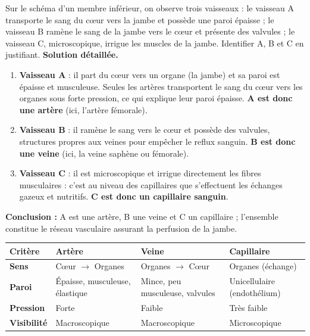 \documentclass[11pt]{article}
\begin{document}
\begin{exoresolu}
Sur le schéma d'un membre inférieur, on observe trois vaisseaux : le vaisseau A transporte le sang du cœur vers la jambe et possède une paroi épaisse ; le vaisseau B ramène le sang de la jambe vers le cœur et présente des valvules ; le vaisseau C, microscopique, irrigue les muscles de la jambe. Identifier A, B et C en justifiant.
\tcblower
\textbf{Solution détaillée.}
\begin{enumerate}
\item \textbf{Vaisseau A} : il part du cœur vers un organe (la jambe) et sa paroi est épaisse et musculeuse. Seules les artères transportent le sang du cœur vers les organes sous forte pression, ce qui explique leur paroi épaisse. \textbf{A est donc une artère} (ici, l'artère fémorale).
\item \textbf{Vaisseau B} : il ramène le sang vers le cœur et possède des valvules, structures propres aux veines pour empêcher le reflux sanguin. \textbf{B est donc une veine} (ici, la veine saphène ou fémorale).
\item \textbf{Vaisseau C} : il est microscopique et irrigue directement les fibres musculaires : c'est au niveau des capillaires que s'effectuent les échanges gazeux et nutritifs. \textbf{C est donc un capillaire sanguin}.
\end{enumerate}
\textbf{Conclusion :} A est une artère, B une veine et C un capillaire ; l'ensemble constitue le réseau vasculaire assurant la perfusion de la jambe.
\end{exoresolu}

\begin{aretenir}
\begin{center}
\begin{tabularx}{\linewidth}{|l|X|X|X|}
\hline
\rowcolor{popblueL} \textbf{Critère} & \textbf{Artère} & \textbf{Veine} & \textbf{Capillaire} \\
\hline
\textbf{Sens} & Cœur $\rightarrow$ Organes & Organes $\rightarrow$ Cœur & Organes (échange) \\
\hline
\textbf{Paroi} & Épaisse, musculeuse, élastique & Mince, peu musculeuse, valvules & Unicellulaire (endothélium) \\
\hline
\textbf{Pression} & Forte & Faible & Très faible \\
\hline
\textbf{Visibilité} & Macroscopique & Macroscopique & Microscopique \\
\hline
\end{tabularx}
\end{center}
\end{aretenir}
\end{document}
